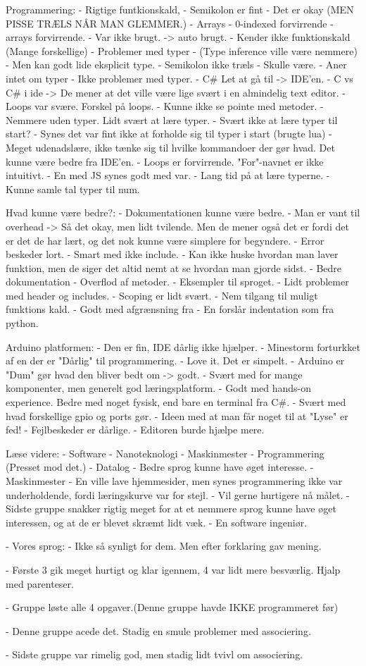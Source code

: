 Programmering:
- Rigtige funtkionskald,
- Semikolon er fint - Det er okay (MEN PISSE TRÆLS NÅR MAN GLEMMER.)
- Arrays - 0-indexed forvirrende - arrays forvirrende.
- Var ikke brugt. -> auto brugt.
- Kender ikke funktionskald (Mange forskellige)
- Problemer med typer - (Type inference ville være nemmere) - Men kan godt lide eksplicit type.
- Semikolon ikke træls - Skulle være.
- Aner intet om typer 
- Ikke problemer med typer.
- C{\#} Let at gå til -> IDE'en. 
- C vs C{\#} i ide -> De mener at det ville være lige svært i en almindelig text editor.
- Loops var svære. Forskel på loops.
- Kunne ikke se pointe med metoder.
- Nemmere uden typer. Lidt svært at lære typer.
- Svært ikke at lære typer til start?
- Synes det var fint ikke at forholde sig til typer i start (brugte lua)
- Meget udenadslære, ikke tænke sig til hvilke kommandoer der gør hvad. Det kunne være bedre fra IDE'en.
- Loops er forvirrende. "For"-navnet er ikke intuitivt. 
- En med JS synes godt med var.
- Lang tid på at lære typerne.
- Kunne samle tal typer til num.

Hvad kunne være bedre?: 
- Dokumentationen kunne være bedre.
- Man er vant til overhead -> Så det okay, men lidt tvilende. Men de mener også det er fordi det er det de har lært, og det nok kunne være simplere for begyndere.
- Error beskeder lort.
- Smart med ikke include.
- Kan ikke huske hvordan man laver funktion, men de siger det altid nemt at se hvordan man gjorde sidst.
- Bedre dokumentation
- Overflod af metoder.
- Eksempler til sproget.
- Lidt problemer med header og includes.
- Scoping er lidt svært.
- Nem tilgang til muligt funktions kald.
- Godt med afgrænsning fra {}
- En forslår indentation som fra python.

Arduino platformen:
- Den er fin, IDE dårlig ikke hjælper.
- Minestorm forturkket af en der er "Dårlig" til programmering.
- Love it. Det er simpelt.
- Arduino er "Dum" gør hvad den bliver bedt om -> godt.
- Svært med for mange komponenter, men generelt god læringsplatform.
- Godt med hands-on experience. Bedre med noget fysisk, end bare en terminal fra C{\#}.
- Svært med hvad forskellige gpio og ports gør.
- Ideen med at man får noget til at "Lyse" er fed!
- Fejlbeskeder er dårlige.
- Editoren burde hjælpe mere.


Læse videre:
- Software
- Nanoteknologi
- Maskinmester
- Programmering (Presset mod det.)
- Datalog 
- Bedre sprog kunne have øget interesse.
- Maskinmester
- En ville lave hjemmesider, men synes programmering ikke var underholdende, fordi læringskurve var for stejl.
- Vil gerne hurtigere nå målet.
- Sidste gruppe snakker rigtig meget for at et nemmere sprog kunne have øget interessen, og at de er blevet skræmt lidt væk.
- En software ingeniør. 


- Vores sprog: 
- Ikke så synligt for dem. Men efter forklaring gav mening.

- Første 3 gik meget hurtigt og klar igennem, 4 var lidt mere besværlig. Hjalp med parenteser.

- Gruppe løste alle 4 opgaver.(Denne gruppe havde IKKE programmeret før)

- Denne gruppe acede det. Stadig en smule problemer med associering.

- Sidste gruppe var rimelig god, men stadig lidt tvivl om associering.